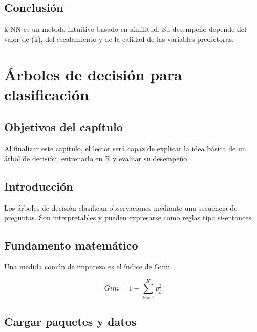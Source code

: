 \documentclass[
  spanish,
  11pt,
  letterpaper,
]{book}
\begin{document}
\section{Conclusión}\label{conclusiuxf3n-3}

k-NN es un método intuitivo basado en similitud. Su desempeño depende
del valor de (k), del escalamiento y de la calidad de las variables
predictoras.


\chapter{Árboles de decisión para
clasificación}\label{uxe1rboles-de-decisiuxf3n-para-clasificaciuxf3n}

\section{Objetivos del capítulo}\label{objetivos-del-capuxedtulo-5}

Al finalizar este capítulo, el lector será capaz de explicar la idea
básica de un árbol de decisión, entrenarlo en R y evaluar su desempeño.

\section{Introducción}\label{introducciuxf3n-2}

Los árboles de decisión clasifican observaciones mediante una secuencia
de preguntas. Son interpretables y pueden expresarse como reglas tipo
si-entonces.

\section{Fundamento matemático}\label{fundamento-matemuxe1tico-1}

Una medida común de impureza es el índice de Gini:

\[
Gini = 1 - \sum_{k=1}^{K} p_k^2
\]

\section{Cargar paquetes y datos}\label{cargar-paquetes-y-datos-1}
\end{document}
